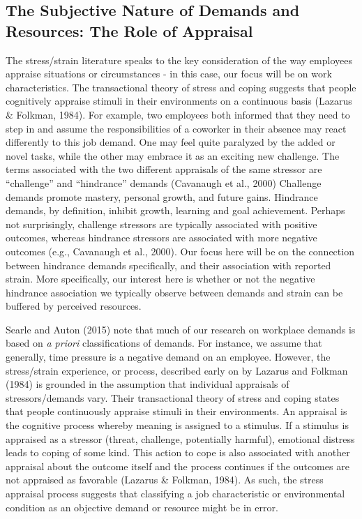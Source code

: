 \documentclass[
  english,
  man]{apa6}
\begin{document}
\hypertarget{the-subjective-nature-of-demands-and-resources-the-role-of-appraisal}{%
\subsection{The Subjective Nature of Demands and Resources: The Role of Appraisal}\label{the-subjective-nature-of-demands-and-resources-the-role-of-appraisal}}

The stress/strain literature speaks to the key consideration of the way employees appraise situations or circumstances - in this case, our focus will be on work characteristics. The transactional theory of stress and coping suggests that people cognitively appraise stimuli in their environments on a continuous basis (Lazarus \& Folkman, 1984). For example, two employees both informed that they need to step in and assume the responsibilities of a coworker in their absence may react differently to this job demand. One may feel quite paralyzed by the added or novel tasks, while the other may embrace it as an exciting new challenge. The terms associated with the two different appraisals of the same stressor are ``challenge'' and ``hindrance'' demands (Cavanaugh et al., 2000) Challenge demands promote mastery, personal growth, and future gains. Hindrance demands, by definition, inhibit growth, learning and goal achievement. Perhaps not surprisingly, challenge stressors are typically associated with positive outcomes, whereas hindrance stressors are associated with more negative outcomes (e.g., Cavanaugh et al., 2000). Our focus here will be on the connection between hindrance demands specifically, and their association with reported strain. More specifically, our interest here is whether or not the negative hindrance association we typically observe between demands and strain can be buffered by perceived resources.

Searle and Auton (2015) note that much of our research on workplace demands is based on \emph{a priori} classifications of demands. For instance, we assume that generally, time pressure is a negative demand on an employee. However, the stress/strain experience, or process, described early on by Lazarus and Folkman (1984) is grounded in the assumption that individual appraisals of stressors/demands vary. Their transactional theory of stress and coping states that people continuously appraise stimuli in their environments. An appraisal is the cognitive process whereby meaning is assigned to a stimulus. If a stimulus is appraised as a stressor (threat, challenge, potentially harmful), emotional distress leads to coping of some kind. This action to cope is also associated with another appraisal about the outcome itself and the process continues if the outcomes are not appraised as favorable (Lazarus \& Folkman, 1984). As such, the stress appraisal process suggests that classifying a job characteristic or environmental condition as an objective demand or resource might be in error.
\end{document}
